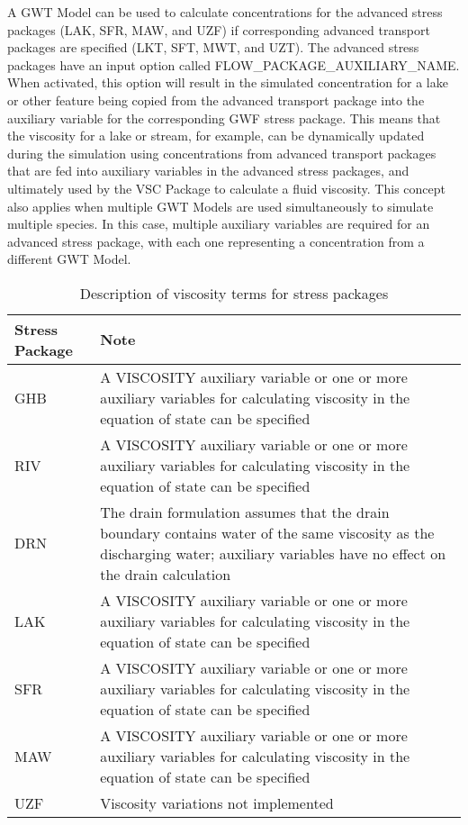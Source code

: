 A GWT Model can be used to calculate concentrations for the advanced stress packages (LAK, SFR, MAW, and UZF) if corresponding advanced transport packages are specified (LKT, SFT, MWT, and UZT).  The advanced stress packages have an input option called FLOW\_PACKAGE\_AUXILIARY\_NAME.  When activated, this option will result in the simulated concentration for a lake or other feature being copied from the advanced transport package into the auxiliary variable for the corresponding GWF stress package.  This means that the viscosity for a lake or stream, for example, can be dynamically updated during the simulation using concentrations from advanced transport packages that are fed into auxiliary variables in the advanced stress packages, and ultimately used by the VSC Package to calculate a fluid viscosity.  This concept also applies when multiple GWT Models are used simultaneously to simulate multiple species.  In this case, multiple auxiliary variables are required for an advanced stress package, with each one representing a concentration from a different GWT Model.  


\begin{longtable}{p{3cm} p{12cm}}
\caption{Description of viscosity terms for stress packages}
\tabularnewline
\hline
\hline
\textbf{Stress Package} & \textbf{Note} \\
\hline
\endhead
\hline
\endfoot
GHB & A VISCOSITY auxiliary variable or one or more auxiliary variables for calculating viscosity in the equation of state can be specified \\
RIV & A VISCOSITY auxiliary variable or one or more auxiliary variables for calculating viscosity in the equation of state can be specified \\
DRN & The drain formulation assumes that the drain boundary contains water of the same viscosity as the discharging water; auxiliary variables have no effect on the drain calculation  \\
LAK & A VISCOSITY auxiliary variable or one or more auxiliary variables for calculating viscosity in the equation of state can be specified \\
SFR & A VISCOSITY auxiliary variable or one or more auxiliary variables for calculating viscosity in the equation of state can be specified \\
MAW & A VISCOSITY auxiliary variable or one or more auxiliary variables for calculating viscosity in the equation of state can be specified \\
UZF & Viscosity variations not implemented \\
\end{longtable}

